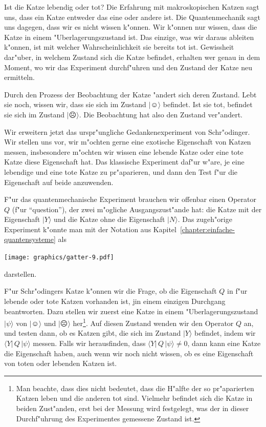 Ist die Katze lebendig oder tot? Die Erfahrung mit makroskopischen
Katzen sagt uns, dass ein Katze entweder das eine oder andere ist.
Die Quantenmechanik sagt uns dagegen, dass wir es nicht wissen k"onnen.
Wir k"onnen nur wissen, dass die Katze in einem "Uberlagerungszustand
ist.
Das einzige, was wir daraus ableiten k"onnen, ist mit welcher
Wahrscheinlichkeit sie bereits tot ist.
Gewissheit dar"uber, in welchem Zustand sich die Katze befindet,
erhalten wer genau in dem Moment, wo wir das Experiment durchf"uhren
und den Zustand der Katze neu ermitteln.

Durch den Prozess der Beobachtung der Katze "andert sich deren Zustand.
Lebt sie noch, wissen wir, dass sie sich im Zustand $|\smiley\rangle$ befindet.
Ist sie tot, befindet sie sich im Zustand $|\frownie\rangle$.
Die Beobachtung hat also den Zustand ver"andert.

Wir erweitern jetzt das urspr"ungliche Gedankenexperiment von Schr"odinger.
Wir stellen uns vor, wir m"ochten gerne eine exotische Eigenschaft von
Katzen messen, insbesondere m"ochten wir wissen eine lebende Katze oder
eine tote Katze diese Eigenschaft hat. Das klassische Experiment
daf"ur w"are, je eine lebendige und eine tote Katze zu pr"aparieren,
und dann den Test f"ur die Eigenschaft auf beide anzuwenden.

F"ur das quantenmechanische Experiment brauchen wir offenbar einen
Operator $Q$ (f"ur ``question''), der zwei m"ogliche Ausgangszust"ande hat:
die Katze mit der
Eigenschaft $|Y\rangle$ und die Katze ohne die Eigenschaft $|N\rangle$.
Das zugeh"orige Experiment k"onnte man mit der Notation aus
Kapitel~\ref{chapter:einfache-quantensysteme} als
\begin{center}
\texttt{[image: graphics/gatter-9.pdf]}
\end{center}
darstellen. 

F"ur Schr"odingers Katze k"onnen wir die Frage, ob die Eigenschaft $Q$
in f"ur lebende oder tote Katzen vorhanden ist, jin einem einzigen
Durchgang beantworten.
Dazu stellen wir zuerst eine Katze in einem "Uberlagerungszustand
$|\psi\rangle$ von $|\smiley\rangle$ und $|\frownie\rangle$ her\footnote{
Man beachte, dass dies nicht bedeutet, dass die H"alfte der so pr"aparierten
Katzen leben und die anderen tot sind.
Vielmehr befindet sich die Katze in beiden Zust"anden, erst bei der
Messung wird festgelegt, was der in dieser Durchf"uhrung des Experimentes
gemessene Zustand ist.
}.
Auf diesen Zustand wenden wir den Operator $Q$ an, und testen dann,
ob es Katzen gibt, die sich im Zustand $|Y\rangle$ befindet, indem
wir $\langle Y|\,Q\,|\psi\rangle$ messen.
Falls wir herausfinden, dass $\langle Y|\,Q\,|\psi\rangle\ne 0$,
dann kann eine Katze die Eigenschaft haben, auch wenn wir noch nicht
wissen, ob es eine Eigenschaft von toten oder lebenden Katzen ist.

